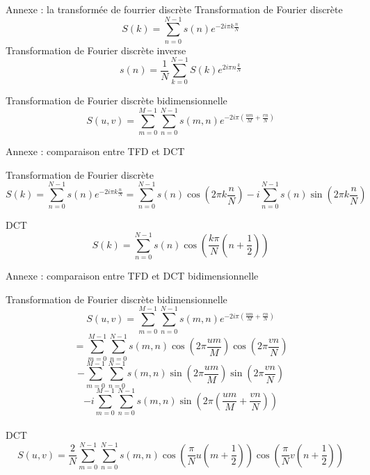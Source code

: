 \documentclass[xcolor=dvipsnames]{beamer}
\begin{document}
\begin{frame} {Annexe : la transformée de fourrier discrète}
    \centering
    Transformation de Fourier discrète
    \[
        S(k) = \sum_{n=0}^{N-1} s(n) e^{-2i\pi k \frac{n}{N}}
    \]
    Transformation de Fourier discrète inverse
    \[
        s(n) = \frac{1}{N} \sum_{k=0}^{N-1} S(k) e^{2i\pi n \frac{k}{N}}
    \]

    Transformation de Fourier discrète bidimensionnelle
    \[
        S(u, v) = \sum_{m=0}^{M-1} \sum_{n=0}^{N-1} s(m, n) e^{-2i\pi \left( \frac{um}{M} + \frac{vn}{N} \right)}        
    \]
    
\end{frame}

\begin{frame} {Annexe : comparaison entre TFD et DCT}

    \footnotesize
    \centering
    
    Transformation de Fourier discrète
    \[
        S(k) = \sum_{n=0}^{N-1} s(n) e^{-2i\pi k \frac{n}{N}} = \sum_{n=0}^{N-1} s(n) \cos\left(2\pi k \frac{n}{N}\right) - i \sum_{n=0}^{N-1} s(n) \sin\left(2\pi k \frac{n}{N}\right)

    \]

    DCT
    \begin{equation*}
        S(k) = \sum_{n=0}^{N-1} s(n) \cos \left( \frac{k\pi}{N} \left( n + \frac{1}{2} \right) \right)
    \end{equation*}    


\end{frame}


\begin{frame} {Annexe : comparaison entre TFD et DCT bidimensionnelle}

    \scriptsize
    \centering
    
    Transformation de Fourier discrète bidimensionnelle
    \[
        S(u, v) = \sum_{m=0}^{M-1} \sum_{n=0}^{N-1} s(m, n) e^{-2i\pi \left( \frac{um}{M} + \frac{vn}{N} \right)} 
    \]
    \[
        =  \sum_{m=0}^{M-1} \sum_{n=0}^{N-1} s(m, n) \cos\left(2\pi \frac{um}{M}\right)\cos\left(2\pi \frac{vn}{N}\right)
    \]  
    \[
        - \sum_{m=0}^{M-1} \sum_{n=0}^{N-1} s(m, n) \sin\left(2\pi \frac{um}{M}\right)\sin\left(2\pi \frac{vn}{N}\right)
    \]  
    \[
        - i \sum_{m=0}^{M-1} \sum_{n=0}^{N-1} s(m, n) \sin\left(2\pi \left( \frac{um}{M} + \frac{vn}{N} \right)\right) 
    \]  
    \\
    DCT
    \[
    S(u, v) = \frac{2}{N} \sum_{m=0}^{N-1} \sum_{n=0}^{N-1} s(m, n) \cos \left( \frac{\pi}{N} u \left( m + \frac{1}{2} \right) \right) \cos \left( \frac{\pi}{N} v \left( n + \frac{1}{2} \right) \right)
    \]

\end{frame}
\end{document}
